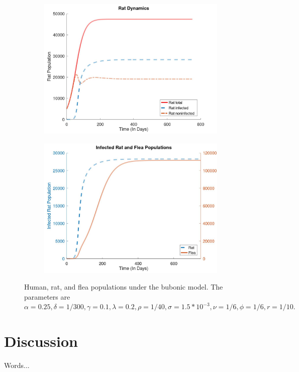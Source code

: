 \documentclass [letterpaper, 12pt] {article}
\begin{document}
\begin{figure}[h!]
\begin{subfigure}{0.48\textwidth}
	\includegraphics[width=\linewidth]{Figures/bubonicrat.jpg}
	\end{subfigure}\hspace{\fill}
	\begin{subfigure}{0.48\textwidth}
	\includegraphics[width=\linewidth]{Figures/Bubonicrf.jpg}
	\end{subfigure}
	\caption{Human, rat, and flea populations under the bubonic model. The parameters are $\alpha=0.25, \delta=1/300, \gamma=0.1, \lambda=0.2, \rho=1/40, \sigma=1.5*10^{-3}, \nu=1/6, \phi=1/6, r=1/10.$}
\end{figure}

\newpage

\section {Discussion}

Words... 




\pagebreak



\end{document}
